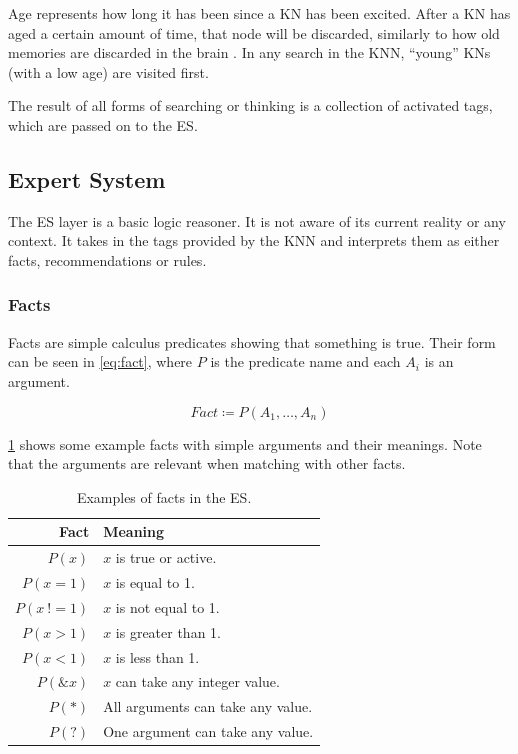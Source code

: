 \documentclass[titlepage,11pt]{article}
\begin{document}
Age represents how long it has been since a KN has been excited. After a KN has aged a certain amount of time, that node will be discarded, similarly to how old memories are discarded in the brain \cite{aging}. In any search in the KNN, ``young'' KNs (with a low age) are visited first.

The result of all forms of searching or thinking is a collection of activated tags, which are passed on to the ES.

\subsection{Expert System} \label{sec:background_expert_system}

The ES layer is a basic logic reasoner. It is not aware of its current reality or any context. It takes in the tags provided by the KNN and interprets them as either facts, recommendations or rules.

\subsubsection{Facts}
Facts are simple calculus predicates showing that something is true. Their form can be seen in \cref{eq:fact}, where $P$ is the predicate name and each $A_i$ is an argument.

\begin{equation} \label{eq:fact}
	Fact \coloneqq P(A_1, \ldots, A_n)
\end{equation}

\cref{table:fact_predicates} shows some example facts with simple arguments and their meanings. Note that the arguments are relevant when matching with other facts.

\begin{table}[!htb]
	\centering
	\caption{Examples of facts in the ES.}
	\begin{tabular}{r | l}
		\textbf{Fact} & \textbf{Meaning} \\ \hline
		$P(x)$ & $x$ is true or active.\\
		$P(x = 1)$ & $x$ is equal to 1. \\
		$P(x \ != 1)$ & $x$ is not equal to 1. \\
		$P(x > 1)$ & $x$ is greater than 1. \\
		$P(x < 1)$ & $x$ is less than 1. \\
		$P(\&x)$ & $x$ can take any integer value. \\
		$P(*)$ & All arguments can take any value. \\
		$P(?)$ & One argument can take any value. \\
	\end{tabular}
	\label{table:fact_predicates}
\end{table}
\end{document}
